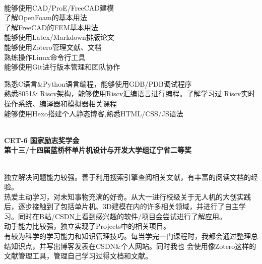 \documentclass{ctexart}
\begin{document}
\begin{center}
    \hrulefill \\
    \begin{minipage}[t]{18em}
        \textbullet 能够使用CAD/ProE/FreeCAD建模\\
        \textbullet 了解OpenFoam的基本用法 \\
        \textbullet 了解FreeCAD的FEM基本用法\\
        \textbullet 能够使用Latex/Markdown排版论文 \\
        \textbullet 能够使用Zotero管理文献、文档 \\
        \textbullet 熟练操作Linux命令行工具 \\
        \textbullet 能够使用Git进行版本管理和团队协作 \\
        
    \end{minipage}
    \quad 
    \begin{minipage}[t]{18em}
        \textbullet 熟悉C语言\&Python语言编程，能够使用GDB/PDB调试程序 \\
        \textbullet 熟悉8051\& Riscv架构，能够使用Riscv汇编语言进行编程。了解学习过
                    Riscv实时操作系统、编译器和模拟器相关课程 \\
        \textbullet 能够使用Hexo搭建个人静态博客,熟悉HTML/CSS/JS语法
    \end{minipage} 
        
    \end{center}

\begin{center}
    \hrulefill \\
    \textbullet \textbf{CET-6} \qquad 
    \textbullet \textbf{国家励志奖学金}\\
    \textbullet \textbf{第十三/十四届蓝桥杯单片机设计与开发大学组辽宁省二等奖}
\end{center}

\newpage

\begin{flushleft}
    {\linespread{1.5}\selectfont
    \hrulefill \\
    \textbullet 独立解决问题能力较强。善于利用搜索引擎查阅相关文献，有丰富的阅读文档的经验。\\
    \textbullet 热爱主动学习，对未知事物充满的好奇。从大一进行校级关于无人机的大创实践后，逐步接触到了包括单片机、3D建模在内的许多相关领域，并进行了自主学习。同时在B站/CSDN上看到感兴趣的软件/项目会尝试进行了解应用。\\
    \textbullet 动手能力比较强，独立实现了Projects中的相关项目。 \\
    \textbullet 有较为科学的学习能力和知识管理技巧。每当学完一门课程时，我都会通过整理总结知识点，并写出博客发表在CSDN\&个人网站。同时我也
                会使用像Zotero这样的文献管理工具，管理自己学习过得文档和文献。
    \par}
\end{flushleft}
\end{document}
